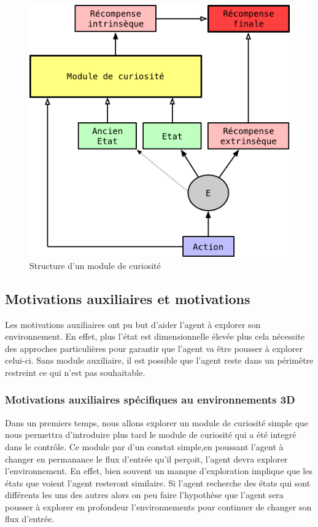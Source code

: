 \begin{figure}[h!]
\begin{center}
    \includegraphics[scale=.5]{./assets/CURIOSITY/curiosity.png}
    \caption{Structure d'un module de curiosité}
\end{center}
\end{figure}

\subsection{Motivations auxiliaires et motivations}

Les motivations auxiliaires ont pu but d'aider l'agent à explorer son environnement. En effet, plus l'état est dimensionnelle élevée plus cela nécessite des approches particulières pour garantir que l'agent va être pousser à explorer celui-ci. Sans module auxiliaire, il est possible que l'agent reste dans un périmêtre restreint ce qui n'est pas souhaitable.

\subsubsection{Motivations auxiliaires spécifiques au environnements 3D}

Dans un premiers temps, nous allons explorer un module de curiosité simple que nous permettra d'introduire plus tard le module de curiosité qui a été integré dans le contrôle. Ce module par d'un constat simple,en poussant l'agent à changer en permanance le flux d'entrée qu'il perçoit, l'agent devra explorer l'environnement. En effet, bien souvent un manque d'exploration implique que les états que voient l'agent resteront similaire. Si l'agent recherche des états qui sont différents les uns des autres alors on peu faire l'hypothèse que l'agent sera pousser à explorer en profondeur l'environnements pour continuer de changer son flux d'entrée.


